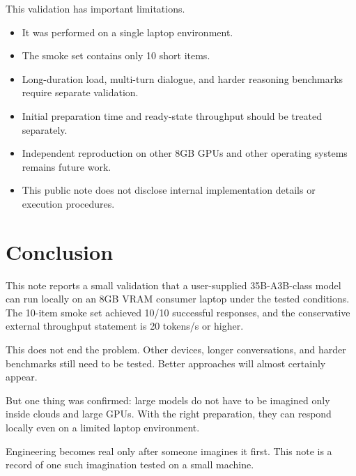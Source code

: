 \documentclass[11pt]{article}
\begin{document}
This validation has important limitations.

\begin{itemize}[leftmargin=1.5em]
  \item It was performed on a single laptop environment.
  \item The smoke set contains only 10 short items.
  \item Long-duration load, multi-turn dialogue, and harder reasoning benchmarks require separate validation.
  \item Initial preparation time and ready-state throughput should be treated separately.
  \item Independent reproduction on other 8GB GPUs and other operating systems remains future work.
  \item This public note does not disclose internal implementation details or execution procedures.
\end{itemize}

\section{Conclusion}

This note reports a small validation that a user-supplied 35B-A3B-class model can run locally on an 8GB VRAM consumer laptop under the tested conditions. The 10-item smoke set achieved 10/10 successful responses, and the conservative external throughput statement is 20 tokens/s or higher.

This does not end the problem. Other devices, longer conversations, and harder benchmarks still need to be tested. Better approaches will almost certainly appear.

But one thing was confirmed: large models do not have to be imagined only inside clouds and large GPUs. With the right preparation, they can respond locally even on a limited laptop environment.

Engineering becomes real only after someone imagines it first. This note is a record of one such imagination tested on a small machine.
\end{document}
